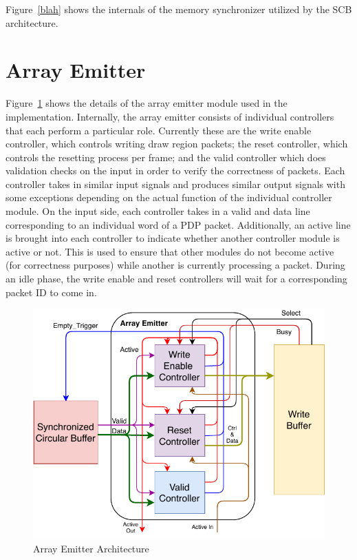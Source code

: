     Figure~\ref{blah} shows the internals of the memory synchronizer utilized by the SCB architecture.

\section{Array Emitter}

    Figure~\ref{fig:ae_arch} shows the details of the array emitter module used in the implementation. Internally, the array emitter consists of individual controllers that each perform a particular role. Currently these are the write enable controller, which controls writing draw region packets; the reset controller, which controls the resetting process per frame; and the valid controller which does validation checks on the input in order to verify the correctness of packets. Each controller takes in similar input signals and produces similar output signals with some exceptions depending on the actual function of the individual controller module. On the input side, each controller takes in a valid and data line corresponding to an individual word of a PDP packet. Additionally, an active line is brought into each controller to indicate whether another controller module is active or not. This is used to ensure that other modules do not become active (for correctness purposes) while another is currently processing a packet. During an idle phase, the write enable and reset controllers will wait for a corresponding packet ID to come in.

    \begin{figure}
        \centering
        \includegraphics[width=1.0\textwidth]{fig/pdp_ae_arch.pdf}
        \caption{Array Emitter Architecture}
        \label{fig:ae_arch}
    \end{figure}


